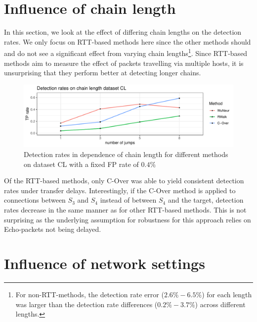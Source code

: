 \documentclass[runningheads,11pt]{llncs}\usepackage[]{graphicx}\usepackage[]{color}
\makeatletter
\def\maxwidth{ %
  \ifdim\Gin@nat@width>\linewidth
    \linewidth
  \else
    \Gin@nat@width
  \fi
}
\newenvironment{knitrout}{}{} %
\makeatother
\begin{document}
\section{Influence of chain length}\label{Sec:Chainl}

In this section, we look at the effect of differing chain lengths on the detection rates. We only focus on RTT-based methods here since the other methods should and do not see a significant effect from varying chain lengths\footnote{For non-RTT-methods, the detection rate error ($2.6\%-6.5\%$) for each length was larger than the detection rate differences ($0.2\%-3.7\%$) across different lengths.}. Since RTT-based methods aim to measure the effect of packets travelling via multiple hosts, it is unsurprising that they perform better at detecting longer chains. 

\begin{knitrout}
\color{fgcolor}\begin{figure}
\includegraphics[width=\maxwidth]{figure/Influencechainl-1} \caption[Detection rates in dependence of chain length for different methods on dataset CL with a fixed FP rate of $0.4\%$]{Detection rates in dependence of chain length for different methods on dataset CL with a fixed FP rate of $0.4\%$}\label{fig:Influencechainl}
\end{figure}


\end{knitrout}


Of the RTT-based methods, only C-Over was able to yield consistent detection rates under transfer delays. 
Interestingly, if the C-Over method is applied to connections between $S_3$ and $S_4$ instead of between $S_4$ and the target, detection rates decrease in the same manner as for other RTT-based methods. This is not surprising as the underlying assumption for robustness for this approach relies on Echo-packets not being delayed.


\section{Influence of network settings}\label{Sec:InfluenceNetwork}
\end{document}

